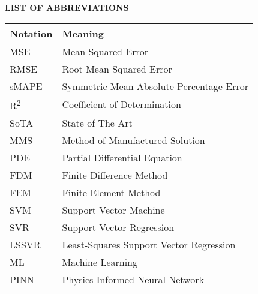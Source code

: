 \clearpage
\begin{center}
  \Large \textbf{LIST OF ABBREVIATIONS}
\end{center}
\vspace{3em}

\begin{center}
  \begin{tabularx}{0.8\textwidth}{>{\raggedright\arraybackslash}X>{\raggedright\arraybackslash}X}
    \toprule
    \textbf{Notation}    & \textbf{Meaning}                         \\
    \midrule
    MSE                  & Mean Squared Error                       \\
    RMSE                 & Root Mean Squared Error                  \\
    sMAPE                & Symmetric Mean Absolute Percentage Error \\
    R\textsuperscript{2} & Coefficient of Determination             \\
    SoTA                 & State of The Art                         \\
    MMS                  & Method of Manufactured Solution           \\
    PDE                  & Partial Differential Equation            \\
    FDM                  & Finite Difference Method                 \\
    FEM                  & Finite Element Method                    \\
    SVM                  & Support Vector Machine                   \\
    SVR                  & Support Vector Regression                \\
    LSSVR                & Least-Squares Support Vector Regression  \\
    ML                   & Machine Learning                         \\
    PINN                 & Physics-Informed Neural Network          \\

    \bottomrule
  \end{tabularx}
\end{center}